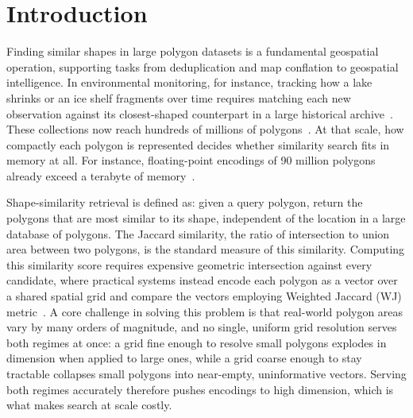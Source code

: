 \documentclass[conference]{IEEEtran}
\newcommand{\rs}[1]{\textcolor{green!55!black}{[RS: #1]}}
\newcommand{\ba}[1]{\textcolor{orange}{[BA: #1]}}
\begin{document}
\section{Introduction}
\label{sec:intro}


Finding similar shapes in large polygon datasets is a fundamental geospatial
operation, supporting tasks from deduplication and map conflation to geospatial
intelligence. In environmental monitoring, for instance, tracking how a lake shrinks
or an ice shelf fragments over time requires matching each new observation against
its closest-shaped counterpart in a large historical archive~\cite{shape2vec}. These
collections now reach hundreds of millions of polygons~\cite{shapetovecplus26}. At
that scale, how compactly each polygon is represented decides whether similarity
search fits in memory at all. For instance,  floating-point encodings of 90 million polygons already
exceed a terabyte of memory~\cite{shapetovecplus26}.


Shape-similarity retrieval is defined as: given a query polygon, return the
polygons that are most similar to its shape, independent of the location in a large database of polygons. The Jaccard
similarity, the ratio of
intersection to union area between two polygons, is the standard measure of this
similarity. Computing this similarity score requires expensive geometric intersection
against every candidate, where practical systems instead encode each polygon as a vector
over a shared spatial grid and compare the vectors employing Weighted Jaccard
(WJ) metric~\cite{rajaraman11}. A core challenge in solving this problem is that real-world
polygon areas vary by many orders of magnitude, and no single, uniform grid
resolution serves both regimes at once: a grid fine enough to resolve small polygons
explodes in dimension when applied to large ones, while a grid coarse enough to stay
tractable collapses small polygons into near-empty, uninformative vectors. Serving
both regimes accurately therefore pushes encodings to high dimension, which is what
makes search at scale costly.
\end{document}
